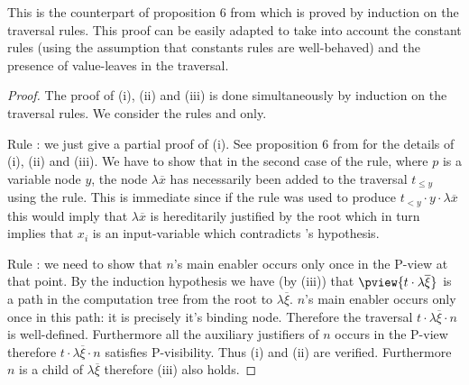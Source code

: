 This is the counterpart of proposition 6 from
\cite{OngHoMchecking2006} which is proved by induction on the
traversal rules. This proof can be easily adapted to take into
account the constant rules (using the assumption that constants
rules are well-behaved) and the presence of value-leaves in the
traversal.
\begin{proof}
The proof of (i), (ii) and (iii) is done simultaneously by induction on the traversal rules. We consider the rules  and  only.

Rule : we just give a partial proof of (i). See proposition 6 from \cite{OngHoMchecking2006} for the details of (i), (ii) and (iii). We have to show that in the second case of the  rule, where $p$ is a variable node $y$, the node $\lambda \overline{x}$ has necessarily been added to the traversal $t_{\leq y}$ using the  rule. This is immediate since if the rule  was used to produce $t_{<y} \cdot y \cdot \lambda \overline{x}$ this would imply that $\lambda \overline{x}$ is hereditarily justified by the root which in turn implies that $x_i$ is an input-variable which contradicts 's hypothesis.

Rule : we need to show that $n$'s main enabler occurs only once in the P-view at that point. By the induction hypothesis we have (by (iii)) that $\pview{t \cdot \lambda \overline{\xi}}$ is a path in the computation tree from the root to $\lambda \overline{\xi}$. $n$'s main enabler occurs only once in this path: it is precisely it's binding node. Therefore the traversal $t \cdot \lambda \overline{\xi} \cdot n$ is well-defined. Furthermore all the auxiliary justifiers of $n$ occurs in the P-view therefore $t \cdot \lambda \overline{\xi} \cdot n$ satisfies P-visibility. Thus (i) and (ii) are verified. Furthermore $n$ is a child of $\lambda \overline{\xi}$ therefore (iii) also holds.
\end{proof}



